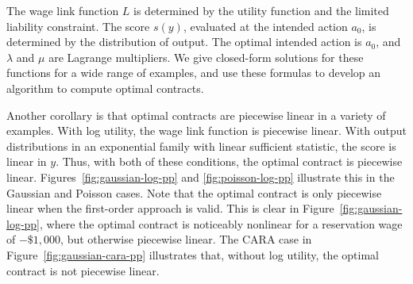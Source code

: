 The wage link function $L$ is determined by the utility function and the limited liability constraint. The score $s(y)$, evaluated at the intended action $a_0$, is determined by the distribution of output. The optimal intended action is $a_0$, and $\lambda$ and $\mu$ are Lagrange multipliers. We give closed-form solutions for these functions for a wide range of examples, and use these formulas to develop an algorithm to compute optimal contracts.

Another corollary is that optimal contracts are piecewise linear in a variety of examples. With log utility, the wage link function is piecewise linear. With output distributions in an exponential family with linear sufficient statistic, the score is linear in $y$. Thus, with both of these conditions, the optimal contract is piecewise linear. Figures~\ref{fig:gaussian-log-pp} and \ref{fig:poisson-log-pp} illustrate this in the Gaussian and Poisson cases. Note that the optimal contract is only piecewise linear when the first-order approach is valid. This is clear in Figure~\ref{fig:gaussian-log-pp}, where the optimal contract is noticeably nonlinear for a reservation wage of $-\$1,000$, but otherwise piecewise linear. The CARA case in Figure~\ref{fig:gaussian-cara-pp} illustrates that, without log utility, the optimal contract is not piecewise linear.

